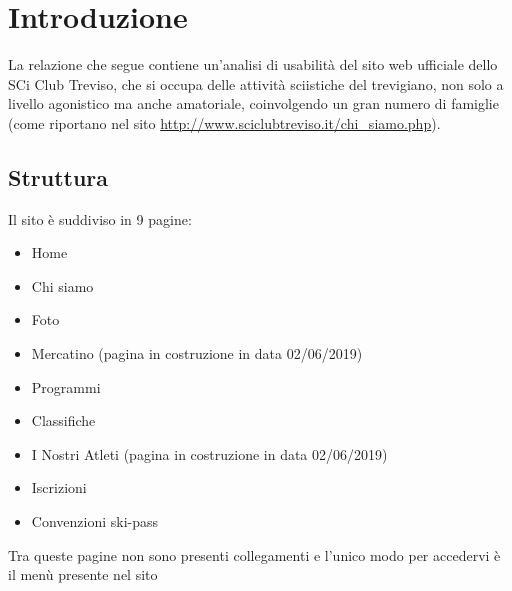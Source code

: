 \chapter{Introduzione}
\label{cap:analisi preliminare}

La relazione che segue contiene un'analisi di usabilità del sito web ufficiale dello SCi Club Treviso, che si occupa delle attività sciistiche del trevigiano, non solo a livello agonistico ma anche amatoriale, coinvolgendo un gran numero di famiglie (come riportano nel sito \url{http://www.sciclubtreviso.it/chi_siamo.php}).

\section{Struttura}

Il sito è suddiviso in 9 pagine: 
\begin{itemize}
    \item Home
    \item Chi siamo
    \item Foto
    \item Mercatino (pagina in costruzione in data 02/06/2019)
    \item Programmi
    \item Classifiche
    \item I Nostri Atleti (pagina in costruzione in data 02/06/2019)
    \item Iscrizioni
    \item Convenzioni ski-pass
\end{itemize}

Tra queste pagine non sono presenti collegamenti e l'unico modo per accedervi è il menù presente nel sito